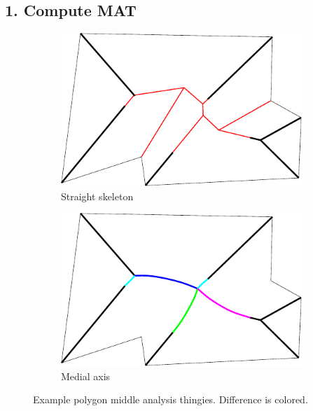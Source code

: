 \subsection{1. Compute MAT}

\begin{figure}
\begin{subfigure}{0.45\columnwidth}
\includegraphics[width=\columnwidth]{sources/method/example_straight_skeleton.pdf}
\caption{Straight skeleton}
\end{subfigure}
\begin{subfigure}{0.45\columnwidth}
\includegraphics[width=\columnwidth]{sources/method/example_medial_axis.pdf}
\caption{Medial axis}
\end{subfigure}
\caption{Example polygon middle analysis thingies. Difference is colored.}
\label{medial_axis_vs_straight_skeleton}
\end{figure}



